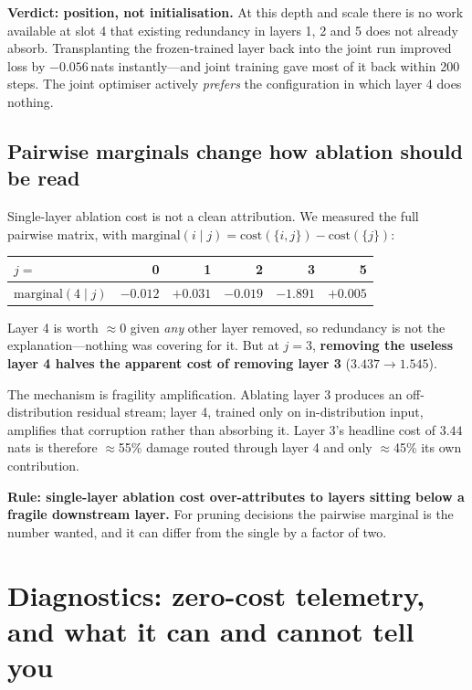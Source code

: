 \documentclass[11pt,a4paper]{article}
\newcommand{\nats}[1]{\ensuremath{#1}\,nats}
\begin{document}
\textbf{Verdict: position, not initialisation.} At this depth and scale there is no work
available at slot 4 that existing redundancy in layers 1, 2 and 5 does not already absorb.
Transplanting the frozen-trained layer back into the joint run improved loss by
\nats{-0.056} instantly---and joint training gave most of it back within 200 steps. The joint
optimiser actively \emph{prefers} the configuration in which layer 4 does nothing.

\subsection{Pairwise marginals change how ablation should be read}

Single-layer ablation cost is not a clean attribution. We measured the full pairwise matrix,
with $\mathrm{marginal}(i \mid j) = \mathrm{cost}(\{i,j\}) - \mathrm{cost}(\{j\})$:

\begin{center}\small
\begin{tabular}{lrrrrr}
\toprule
$j =$ & 0 & 1 & 2 & \textbf{3} & 5 \\
\midrule
$\mathrm{marginal}(4 \mid j)$ & $-0.012$ & $+0.031$ & $-0.019$ & $\mathbf{-1.891}$ & $+0.005$ \\
\bottomrule
\end{tabular}
\end{center}

Layer 4 is worth $\approx$0 given \emph{any} other layer removed, so redundancy is not the
explanation---nothing was covering for it. But at $j = 3$, \textbf{removing the useless layer 4
halves the apparent cost of removing layer 3} ($3.437 \to 1.545$).

The mechanism is fragility amplification. Ablating layer 3 produces an off-distribution
residual stream; layer 4, trained only on in-distribution input, amplifies that corruption
rather than absorbing it. Layer 3's headline cost of \nats{3.44} is therefore
$\approx$55\% damage routed through layer 4 and only $\approx$45\% its own contribution.

\textbf{Rule: single-layer ablation cost over-attributes to layers sitting below a fragile
downstream layer.} For pruning decisions the pairwise marginal is the number wanted, and it can
differ from the single by a factor of two.

\section{Diagnostics: zero-cost telemetry, and what it can and cannot tell you}\label{sec:diag}
\end{document}
